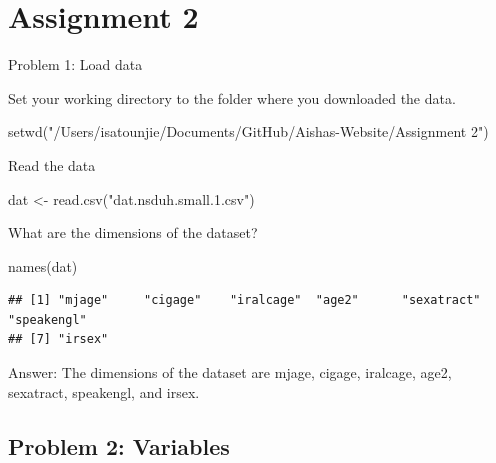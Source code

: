 \documentclass[
]{article}
\newenvironment{Shaded}{\begin{snugshade}}{\end{snugshade}}
\newcommand{\FunctionTok}[1]{\textcolor[rgb]{0.00,0.00,0.00}{#1}}
\newcommand{\NormalTok}[1]{#1}
\newcommand{\OtherTok}[1]{\textcolor[rgb]{0.56,0.35,0.01}{#1}}
\newcommand{\SpecialCharTok}[1]{\textcolor[rgb]{0.00,0.00,0.00}{#1}}
\newcommand{\StringTok}[1]{\textcolor[rgb]{0.31,0.60,0.02}{#1}}
\begin{document}
\hypertarget{assignment-2}{%
\section{Assignment 2}\label{assignment-2}}

Problem 1: Load data

Set your working directory to the folder where you downloaded the data.

\begin{Shaded}
\begin{Highlighting}[]
\FunctionTok{setwd}\NormalTok{(}\StringTok{"/Users/isatounjie/Documents/GitHub/Aishas{-}Website/Assignment 2"}\NormalTok{)}
\end{Highlighting}
\end{Shaded}

Read the data

\begin{Shaded}
\begin{Highlighting}[]
\NormalTok{dat }\OtherTok{\textless{}{-}} \FunctionTok{read.csv}\NormalTok{(}\StringTok{"dat.nsduh.small.1.csv"}\NormalTok{)}
\end{Highlighting}
\end{Shaded}

What are the dimensions of the dataset?

\begin{Shaded}
\begin{Highlighting}[]
\FunctionTok{names}\NormalTok{(dat)}
\end{Highlighting}
\end{Shaded}

\begin{verbatim}
## [1] "mjage"     "cigage"    "iralcage"  "age2"      "sexatract" "speakengl"
## [7] "irsex"
\end{verbatim}

Answer: The dimensions of the dataset are mjage, cigage, iralcage, age2,
sexatract, speakengl, and irsex.

\hypertarget{problem-2-variables}{%
\subsection{Problem 2: Variables}\label{problem-2-variables}}

\begin{Shaded}
\end{Shaded}
\end{document}
